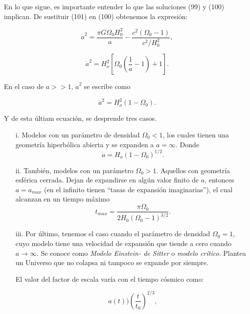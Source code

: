 \documentclass[11pt]{article}
\begin{document}
{    En lo que sigue, es importante entender lo que las soluciones (99) y (100) implican. De sustituir (101) en (100) obtenemos la expresión: 
    
    \begin{equation*}
       \dot{a}^2 = \frac{\pi G \Omega_0 H_0^2  }{a} - \frac{c^2 (\Omega_0 - 1)}{c^2/H_0^2}, 
    \end{equation*}
    
    \begin{equation}
       \boxed{\dot{a}^2 = H_o^2 \left[ \Omega_0 \left( \frac{1}{a} - 1 \right) + 1 \right].}
    \end{equation}
    
    En el caso de $a >> 1$, $\dot{a}^2$ se escribe como
    
    \begin{equation}
        \boxed{ \dot{a}^2  = H_o^2 (1- \Omega_0).}
    \end{equation}
    
    Y de esta últiam ecuación, se desprende tres casos. 
    
    \begin{itemize}
        \item[i.] Modelos con un parámetro de densidad $\Omega_0 < 1$, los cuales tienen una geometría hiperbólica abierta y se expanden a $a=\infty$. Donde 
        $$\dot{a}  = H_o (1- \Omega_0)^{1/2}.$$
        
        \item[ii.] También, modelos con un parámetro $\Omega_0 >1$. Aquellos con geometría esférica cerrada. Dejan de expandirse en algún valor finito de $a$, entonces $a=a_{max}$ (en el infinito tienen ``tasas de expansión imaginarias''), el cual alcanzan en un tiempo máximo 
        $$t_{max} = \frac{\pi \Omega_0}{2 H_0 (\Omega_0 - 1)^{3/2}}.$$
        
        \item[iii.] Por último, tenemos el caso cuando el parámetro de densidad $\Omega_0 = 1$, cuyo modelo tiene una velocidad de expansión que tiende a cero cuando $a \rightarrow{\infty}$. 
    Se conoce como {\textit{Modelo Einstein- de Sitter}} o {\textit{modelo crítico}}. Plantea un Universo que no colapsa ni tampoco se expande por siempre. 

    El valor del factor de escala varía con el tiempo cósmico como:

    \begin{equation}
    a(t) ) \left( \frac{t}{t_0} \right)^{2/3},
    \end{equation} 


\end{itemize}}
\end{document}
